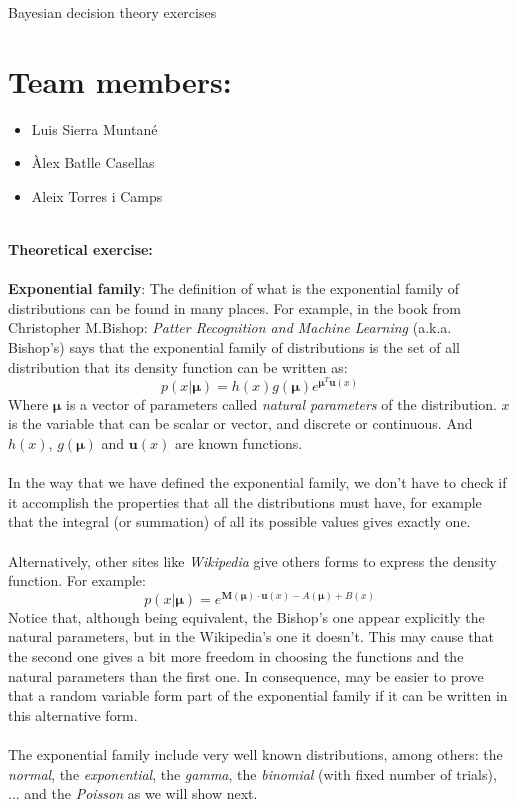 \documentclass[10pt]{article}
\begin{document}
\begingroup
  \centering
  \Huge Bayesian decision theory exercises
  \vskip 1cm
\endgroup
\section{Team members:}
\begin{itemize}
  \item Luis Sierra Muntané
  \item Àlex Batlle Casellas
  \item Aleix Torres i Camps
\end{itemize}
\ \\
\Huge{\textbf{Theoretical exercise:}} \\ \ \\
\Large{\textbf{Exponential family}}:
\Large
The definition of what is the exponential family of distributions can be found in many places. For example, in the book from Christopher M.Bishop: \textit{Patter Recognition and Machine Learning} (a.k.a. Bishop's) says that the exponential family of distributions is the set of all distribution that its density function can be written as:
$$
p(x|\bm\mu)=
h(x)g(\bm\mu)e^{\bm\mu^T \bm{u}(x)}
$$
Where $\bm\mu$ is a vector of parameters called \textit{natural parameters} of the distribution. $x$ is the variable that can be scalar or vector, and discrete or continuous. And $h(x)$, $g(\bm\mu)$ and $\bm{u}(x)$ are known functions. \\ \ \\
In the way that we have defined the exponential family, we don't have to check if it accomplish the properties that all the distributions must have, for example that the integral (or summation) of all its possible values gives exactly one. \\ \ \\ 
Alternatively, other sites like \textit{Wikipedia} give others forms to express the density function. For example:
$$
p(x|\bm\mu)= e^{\bm M(\bm\mu)\cdot \bm u(x)-A(\bm\mu)+B(x)}
$$
Notice that, although being equivalent, the Bishop's one appear explicitly the natural parameters, but in the Wikipedia's one it doesn't. This may cause that the second one gives a bit more freedom in choosing the functions and the natural parameters than the first one. In consequence, may be easier to prove that a random variable form part of the exponential family if it can be written in this alternative form. \\ \ \\
The exponential family include very well known distributions, among others: the \textit{normal}, the \textit{exponential}, the \textit{gamma}, the \textit{binomial} (with fixed number of trials), ... and the \textit{Poisson} as we will show next. \\
\end{document}
